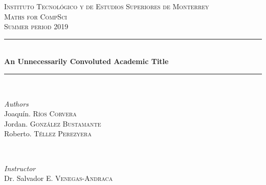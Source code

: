 \documentclass[12pt, a4paper]{article}
\begin{document}
	
	
	\begin{titlepage} %
		\newcommand{\HRule}{\rule{\linewidth}{0.5mm}} %
		
		\center %
		
		
		\textsc{\LARGE Instituto Tecnológico y de Estudios Superiores de Monterrey}\\[1.5cm] %
		
		\textsc{\Large Maths for CompSci}\\[0.5cm] %
		
		\textsc{\large Summer period 2019}\\[0.5cm] %
		
		
		\HRule\\[0.4cm]
		
		{\huge\bfseries An Unnecessarily Convoluted Academic Title}\\[0.4cm] %
		
		\HRule\\[1.5cm]
		
		
		\begin{minipage}{0.4\textwidth}
			\begin{flushleft}
				\large
				\textit{Authors}\\
				Joaquín. \textsc{Ríos Corvera}\\
				Jordan. \textsc{González Bustamante}\\
				Roberto. \textsc{Téllez Perezyera} %
			\end{flushleft}
		\end{minipage}
		~
		\begin{minipage}{0.4\textwidth}
			\begin{flushright}
				\large
				\textit{Instructor}\\
				Dr. Salvador E. \textsc{Venegas-Andraca} %
			\end{flushright}
		\end{minipage}
		

\end{titlepage}
\end{document}
